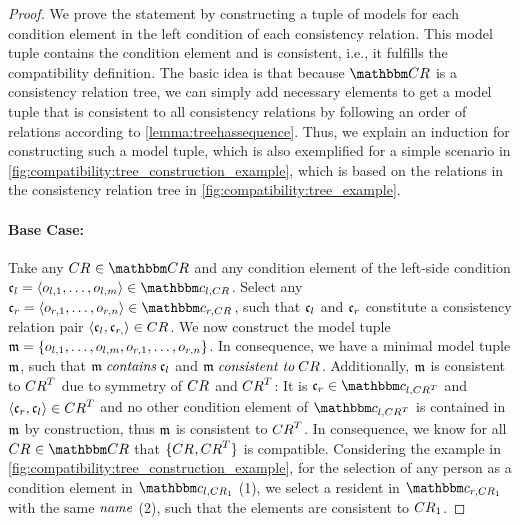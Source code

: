 \newcommand{\smallerparagraph}[1]{\vspace{-1em}\paragraph{#1}}
\begin{proof}
    We prove the statement by constructing a tuple of models for each condition element in the left condition of each consistency relation.
    This model tuple contains the condition element and is consistent, i.e., it fulfills the compatibility definition.
    The basic idea is that because $\consistencyrelationset{CR}$ is a consistency relation tree, we can simply add necessary elements to get a model tuple that is consistent to all consistency relations by following an order of relations according to \autoref{lemma:treehassequence}.
    Thus, we explain an induction for constructing such a model tuple, which is also exemplified for a simple scenario in \autoref{fig:compatibility:tree_construction_example}, which is based on the relations in the consistency relation tree in \autoref{fig:compatibility:tree_example}.
    
    \smallerparagraph{Base Case:}
    Take any $\consistencyrelation{CR}{} \in \consistencyrelationset{CR}$ and any condition element of the left-side condition $\conditionelement{c}{l} = \tupled{\object{o}{l,1}, \dots, \object{o}{l,m}} \in \condition{c}{l, \consistencyrelation{CR}{}}$.
    Select any $\conditionelement{c}{r} = \tupled{\object{o}{r,1}, \dots, \object{o}{r,n}} \in \condition{c}{r, \consistencyrelation{CR}{}}$, such that $\conditionelement{c}{l}$ and $\conditionelement{c}{r}$ constitute a consistency relation pair $\tupled{\conditionelement{c}{l}, \conditionelement{c}{r,}} \in \consistencyrelation{CR}{}$.
    We now construct the model tuple $\modeltuple{m} = \setted{\object{o}{l,1}, \dots, \object{o}{l,m}, \object{o}{r,1}, \dots, \object{o}{r,n}}$.
    In consequence, we have a minimal model tuple $\modeltuple{m}$, such that $\modeltuple{m} \containsmath \conditionelement{c}{l}$ and $\modeltuple{m} \consistenttomath \consistencyrelation{CR}{}$.
    Additionally, $\modeltuple{m}$ is consistent to $\consistencyrelation{CR}{}^T$ due to symmetry of $\consistencyrelation{CR}{}$ and $\consistencyrelation{CR}{}^T$: It is $\conditionelement{c}{r} \in \condition{c}{l,\consistencyrelation{CR}{}^T}$ and $\tupled{\conditionelement{c}{r}, \conditionelement{c}{l}} \in \consistencyrelation{CR}{}^T$ and no other condition element of $\condition{c}{l,\consistencyrelation{CR}{}^T}$ is contained in $\modeltuple{m}$ by construction, thus $\modeltuple{m}$ is consistent to $\consistencyrelation{CR}{}^T$.
    In consequence, we know for all $\consistencyrelation{CR}{} \in \consistencyrelationset{CR}$ that $\setted{\consistencyrelation{CR}{}, \consistencyrelation{CR}{}^T}$ is compatible. 
    Considering the example in \autoref{fig:compatibility:tree_construction_example}, for the selection of any person as a condition element in $\condition{c}{l,\consistencyrelation{CR}{1}}$ (1), we select a resident in $\condition{c}{r,\consistencyrelation{CR}{1}}$ with the same $\mathit{name}$ (2), such that the elements are consistent to $\consistencyrelation{CR}{1}$.
    

\end{proof}
